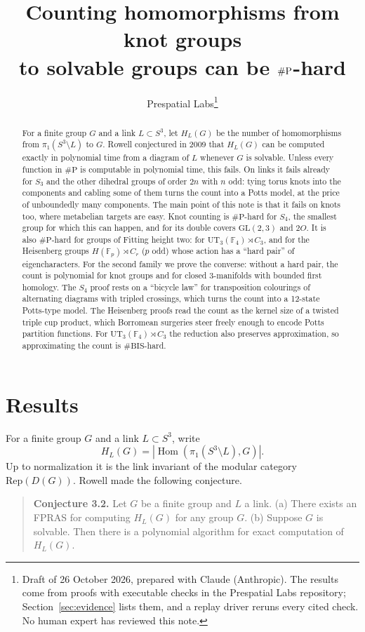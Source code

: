 \documentclass[11pt]{article}
\title{Counting homomorphisms from knot groups\\ to solvable groups can be $\sharpP$-hard}
\author{Prespatial Labs\thanks{Draft of 26 October 2026, prepared with Claude
(Anthropic). The results come from proofs with executable checks in the
Prespatial Labs repository; Section~\ref{sec:evidence} lists them, and a replay
driver reruns every cited check. No human expert has reviewed this note.}}
\date{}
\theoremstyle{definition}
\theoremstyle{remark}
\newcommand{\F}{\mathbb{F}}
\newcommand{\Hom}{\operatorname{Hom}}
\newcommand{\sharpP}{\#\mathrm{P}}
\begin{document}
\maketitle

\begin{abstract}
For a finite group $G$ and a link $L\subset S^3$, let $H_L(G)$ be the number of
homomorphisms from $\pi_1(S^3\setminus L)$ to $G$. Rowell conjectured in 2009
that $H_L(G)$ can be computed exactly in polynomial time from a diagram of $L$
whenever $G$ is solvable. Unless every function in $\sharpP$ is computable in
polynomial time, this fails. On links it fails already for $S_3$ and the other
dihedral groups of order $2n$ with $n$ odd: tying torus knots into the
components and cabling some of them turns the count into a Potts model, at the
price of unboundedly many components. The main point of this note is that it
fails on knots too, where metabelian targets are easy. Knot counting is
$\sharpP$-hard for $S_4$, the smallest group for which this can happen, and for
its double covers $\mathrm{GL}(2,3)$ and $2O$. It is also $\sharpP$-hard for
groups of Fitting height two: for $\mathrm{UT}_3(\F_4)\rtimes
C_3$, and for the Heisenberg groups $H(\F_p)\rtimes C_r$ ($p$ odd) whose
action has a ``hard pair'' of eigencharacters. For the second family we prove
the converse: without a hard pair, the count is polynomial for knot groups and
for closed 3-manifolds with bounded first homology. The $S_4$ proof rests on a
``bicycle law'' for transposition colourings of alternating diagrams with
tripled crossings, which turns the count into a 12-state Potts-type model. The
Heisenberg proofs read the count as the kernel size of a twisted triple cup
product, which Borromean surgeries steer freely enough to encode Potts
partition functions. For $\mathrm{UT}_3(\F_4)\rtimes C_3$ the reduction also
preserves approximation, so approximating the count is $\#\mathrm{BIS}$-hard.
\end{abstract}

\section{Results}

For a finite group $G$ and a link $L\subset S^3$, write
\[
H_L(G)=|\Hom(\pi_1(S^3\setminus L),G)|.
\]
Up to normalization it is the link invariant of the modular category
$\mathrm{Rep}(D(G))$. Rowell
\cite[\S3.3.5]{Row09} made the following conjecture.

\begin{quote}
\textbf{Conjecture 3.2.} Let $G$ be a finite group and $L$ a link.
(a) There exists an FPRAS for computing $H_L(G)$ for any group $G$.
(b) Suppose $G$ is solvable. Then there is a polynomial algorithm for exact
computation of $H_L(G)$.
\end{quote}
\end{document}
